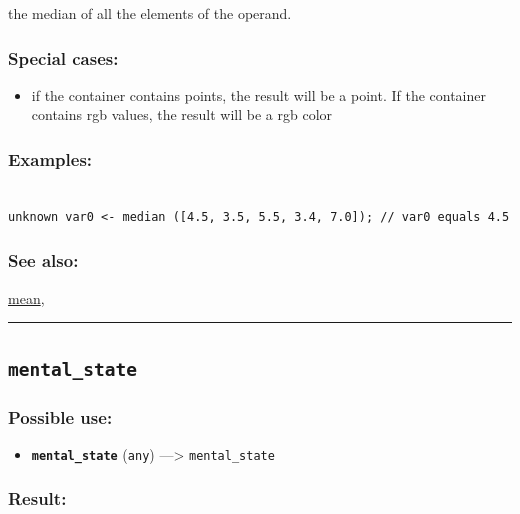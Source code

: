 \documentclass[]{book}
\providecommand{\tightlist}{%
  \setlength{\itemsep}{0pt}\setlength{\parskip}{0pt}}
\theoremstyle{definition}
\theoremstyle{definition}
\theoremstyle{definition}
\theoremstyle{remark}
\begin{document}
the median of all the elements of the operand.

\subsubsection{Special cases:}\label{special-cases-97}

\begin{itemize}
\tightlist
\item
  if the container contains points, the result will be a point. If the
  container contains rgb values, the result will be a rgb color
\end{itemize}

\subsubsection{Examples:}\label{examples-240}

\begin{verbatim}
 
unknown var0 <- median ([4.5, 3.5, 5.5, 3.4, 7.0]); // var0 equals 4.5
\end{verbatim}

\subsubsection{See also:}\label{see-also-140}

\href{operators-i-to-m.html\#mean}{mean},

\begin{center}\rule{0.5\linewidth}{\linethickness}\end{center}

\subsection{\texorpdfstring{\texttt{mental\_state}}{mental\_state}}\label{mental_state}

\subsubsection{Possible use:}\label{possible-use-348}

\begin{itemize}
\tightlist
\item
  \textbf{\texttt{mental\_state}} (\texttt{any}) ---\textgreater{}
  \texttt{mental\_state}
\end{itemize}

\subsubsection{Result:}\label{result-337}
\end{document}
